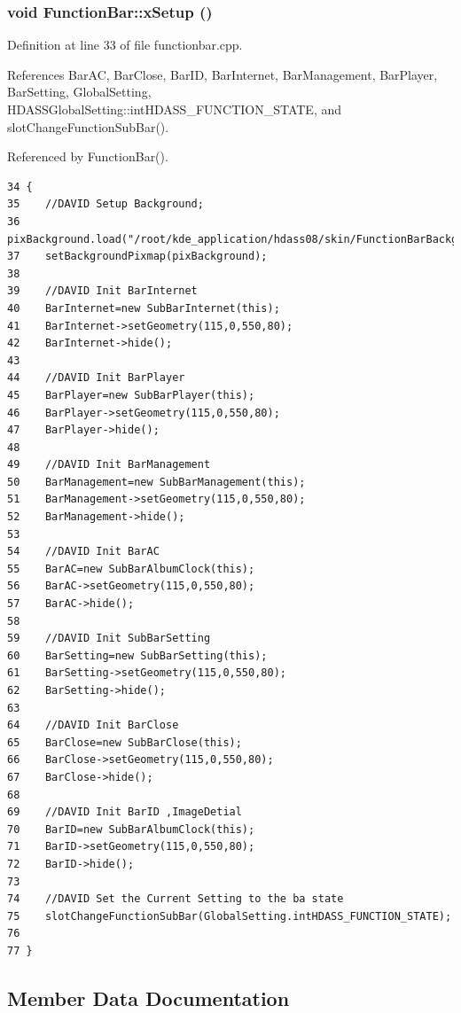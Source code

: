\subsubsection{\setlength{\rightskip}{0pt plus 5cm}void Function\-Bar::x\-Setup ()}\label{classFunctionBar_FunctionBara2}




Definition at line 33 of file functionbar.cpp.

References Bar\-AC, Bar\-Close, Bar\-ID, Bar\-Internet, Bar\-Management, Bar\-Player, Bar\-Setting, Global\-Setting, HDASSGlobal\-Setting::int\-HDASS\_\-FUNCTION\_\-STATE, and slot\-Change\-Function\-Sub\-Bar().

Referenced by Function\-Bar().



\footnotesize\begin{verbatim}34 {
35    //DAVID Setup Background;
36    pixBackground.load("/root/kde_application/hdass08/skin/FunctionBarBackground.jpg");
37    setBackgroundPixmap(pixBackground);
38    
39    //DAVID Init BarInternet
40    BarInternet=new SubBarInternet(this);
41    BarInternet->setGeometry(115,0,550,80);
42    BarInternet->hide();
43    
44    //DAVID Init BarPlayer
45    BarPlayer=new SubBarPlayer(this);
46    BarPlayer->setGeometry(115,0,550,80);
47    BarPlayer->hide();
48    
49    //DAVID Init BarManagement
50    BarManagement=new SubBarManagement(this);
51    BarManagement->setGeometry(115,0,550,80);
52    BarManagement->hide();
53    
54    //DAVID Init BarAC
55    BarAC=new SubBarAlbumClock(this);
56    BarAC->setGeometry(115,0,550,80);
57    BarAC->hide();
58    
59    //DAVID Init SubBarSetting
60    BarSetting=new SubBarSetting(this);
61    BarSetting->setGeometry(115,0,550,80);
62    BarSetting->hide();
63    
64    //DAVID Init BarClose
65    BarClose=new SubBarClose(this);
66    BarClose->setGeometry(115,0,550,80);
67    BarClose->hide();
68    
69    //DAVID Init BarID ,ImageDetial
70    BarID=new SubBarAlbumClock(this);
71    BarID->setGeometry(115,0,550,80);
72    BarID->hide();
73    
74    //DAVID Set the Current Setting to the ba state
75    slotChangeFunctionSubBar(GlobalSetting.intHDASS_FUNCTION_STATE);
76    
77 }
\end{verbatim}\normalsize 


\subsection{Member Data Documentation}
